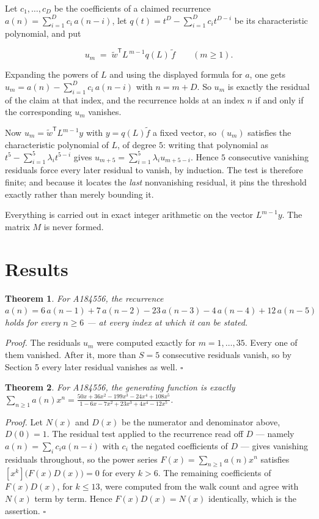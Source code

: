 \documentclass[11pt]{article}
\newtheorem{theorem}{Theorem}
\theoremstyle{definition}
\begin{document}
Let $c_1,\dots,c_D$ be the coefficients of a claimed recurrence $a(n) = \sum_{i=1}^{D} c_i\,a(n-i)$, let $q(t) = t^{D} - \sum_{i=1}^{D} c_i t^{D-i}$ be its characteristic polynomial, and put

\[u_m \;=\; \tilde w^{\mathsf T} L^{\,m-1} q(L)\,\tilde f \qquad (m \ge 1).\]

Expanding the powers of $L$ and using the displayed formula for $a$, one gets $u_m = a(n) - \sum_{i=1}^{D} c_i\,a(n-i)$ with $n = m + D$. So $u_m$ is exactly the residual of the claim at that index, and the recurrence holds at an index $n$ if and only if the corresponding $u_m$ vanishes.

Now $u_m = \tilde w^{\mathsf T} L^{m-1} y$ with $y = q(L)\tilde f$ a fixed vector, so $(u_m)$ satisfies the characteristic polynomial of $L$, of degree $5$: writing that polynomial as $t^{5} - \sum_{i=1}^{5} \lambda_i t^{5-i}$ gives $u_{m+5} = \sum_{i=1}^{5} \lambda_i u_{m+5-i}$. Hence $5$ consecutive vanishing residuals force every later residual to vanish, by induction. The test is therefore finite; and because it locates the {\itshape last} nonvanishing residual, it pins the threshold exactly rather than merely bounding it.

Everything is carried out in exact integer arithmetic on the vector $L^{m-1}y$. The matrix $M$ is never formed.

\section{Results}

\begin{theorem} For A184556, the recurrence $a(n) = 6\,a(n-1) + 7\,a(n-2) - 23\,a(n-3) - 4\,a(n-4) + 12\,a(n-5)$ holds for every $n \ge 6$ --- at every index at which it can be stated.\end{theorem}

{\itshape Proof.} The residuals $u_m$ were computed exactly for $m = 1,\dots,35$. Every one of them vanished. After it, more than $S = 5$ consecutive residuals vanish, so by Section 5 every later residual vanishes as well. $\square$

\begin{theorem} For A184556, the generating function is exactly $\sum_{n\ge 1} a(n)x^n = \frac{50x + 36x^{2} - 199x^{3} - 24x^{4} + 108x^{5}}{1 - 6x - 7x^{2} + 23x^{3} + 4x^{4} - 12x^{5}}$.\end{theorem}

{\itshape Proof.} Let $N(x)$ and $D(x)$ be the numerator and denominator above, $D(0)=1$. The residual test applied to the recurrence read off $D$ --- namely $a(n) = \sum_i c_i a(n-i)$ with $c_i$ the negated coefficients of $D$ --- gives vanishing residuals throughout, so the power series $F(x)=\sum_{n\ge 1}a(n)x^n$ satisfies $[x^k]\bigl(F(x)D(x)\bigr) = 0$ for every $k > 6$. The remaining coefficients of $F(x)D(x)$, for $k \le 13$, were computed from the walk count and agree with $N(x)$ term by term. Hence $F(x)D(x) = N(x)$ identically, which is the assertion. $\square$
\end{document}
